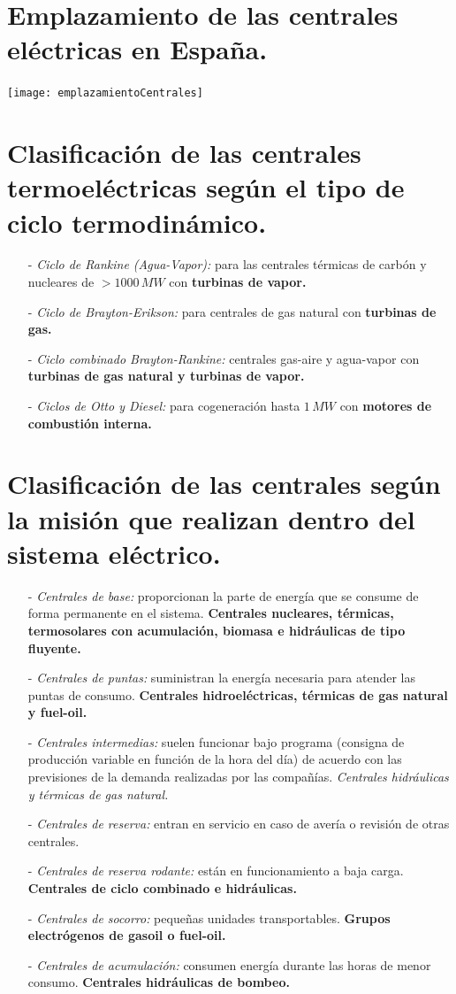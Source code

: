 \section{Emplazamiento de las centrales eléctricas en España.}
	\texttt{[image: emplazamientoCentrales]}
	
\section{Clasificación de las centrales termoeléctricas según el tipo de ciclo termodinámico.}
	\begin{itemize}
		\item[-] \textit{Ciclo de Rankine (Agua-Vapor):}
			para las centrales térmicas de carbón y nucleares de $>1000\,MW$ con \textbf{turbinas de vapor.}
		\item[-] \textit{Ciclo de Brayton-Erikson:}
			para centrales de gas natural con \textbf{turbinas de gas.}
		\item[-] \textit{Ciclo combinado Brayton-Rankine:} 
			centrales gas-aire y agua-vapor con \textbf{turbinas de gas natural y turbinas de vapor.}
		\item[-] \textit{Ciclos de Otto y Diesel:} 
			para cogeneración hasta $1\,MW$ con \textbf{motores de combustión interna.}
	\end{itemize}
	
\section{Clasificación de las centrales según la misión que realizan dentro del sistema eléctrico.}
	\begin{itemize}
		\item[-] \textit{Centrales de base:} 
			proporcionan la parte de energía que se consume de forma permanente en el sistema. \textbf{Centrales nucleares, térmicas, termosolares con acumulación, biomasa e hidráulicas de tipo fluyente.}
		\item[-] \textit{Centrales de puntas:}
			suministran la energía necesaria para atender las puntas de consumo. \textbf{Centrales hidroeléctricas, térmicas de gas natural y fuel-oil.}
		\item[-] \textit{Centrales intermedias:}
			suelen funcionar bajo programa (consigna de producción variable en función de la hora del día) de acuerdo con las previsiones de la demanda realizadas por las compañías. \textit{Centrales hidráulicas y térmicas de gas natural.}
		\item[-] \textit{Centrales de reserva:}
			entran en servicio en caso de avería o revisión de otras centrales.
		\item[-] \textit{Centrales de reserva rodante:}
			están en funcionamiento a baja carga. \textbf{Centrales de ciclo combinado e hidráulicas.}
		\item[-] \textit{Centrales de socorro:}
			pequeñas unidades transportables. \textbf{Grupos electrógenos de gasoil o fuel-oil.}
		\item[-] \textit{Centrales de acumulación:}
			consumen energía durante las horas de menor consumo. \textbf{Centrales hidráulicas de bombeo.}
	\end{itemize}
	
